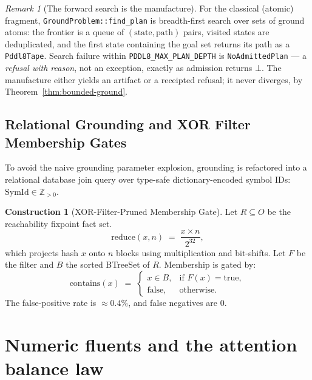 \documentclass[11pt,oneside]{book}
\theoremstyle{definition}
\newtheorem{construction}{Construction}[chapter]
\theoremstyle{plain}
\theoremstyle{remark}
\newtheorem*{remark}{Remark}
\newcommand{\Rfsl}{\bot}                        %
\newcommand{\code}[1]{\texttt{#1}}
\begin{document}
\begin{remark}[The forward search is the manufacture]
For the classical (atomic) fragment, \code{GroundProblem::find\_plan} is breadth-first search
over sets of ground atoms: the frontier is a queue of $(\text{state},\text{path})$ pairs,
visited states are deduplicated, and the first state containing the goal set returns its path
as a \code{Pddl8Tape}. Search failure within \code{PDDL8\_MAX\_PLAN\_DEPTH} is
\code{NoAdmittedPlan} --- a \emph{refusal with reason}, not an exception, exactly as admission
returns $\Rfsl$. The manufacture either yields an artifact or a receipted refusal; it never
diverges, by Theorem~\ref{thm:bounded-ground}.
\end{remark}

\subsection{Relational Grounding and XOR Filter Membership Gates}

To avoid the naive grounding parameter explosion, grounding is refactored into a relational database join query over type-safe dictionary-encoded symbol IDs: $\text{SymId} \in \mathbb{Z}_{>0}$.

\begin{construction}[XOR-Filter-Pruned Membership Gate]\label{con:xorf}
Let $R\subseteq O$ be the reachability fixpoint fact set.%
\begin{equation}\label{eq:fastrange}
\text{reduce}(x, n)\;=\;\frac{x \times n}{2^{32}},
\end{equation}
which projects hash $x$ onto $n$ blocks using multiplication and bit-shifts. Let $F$ be the filter and $B$ the sorted BTreeSet of $R$. Membership is gated by:
\[
\text{contains}(x)\;=\;
\begin{cases}
x\in B, & \text{if } F(x) = \text{true},\\
\text{false}, & \text{otherwise}.
\end{cases}
\]
The false-positive rate is $\approx 0.4\%$, and false negatives are $0$.
\end{construction}

\section{Numeric fluents and the attention balance law}
\end{document}
